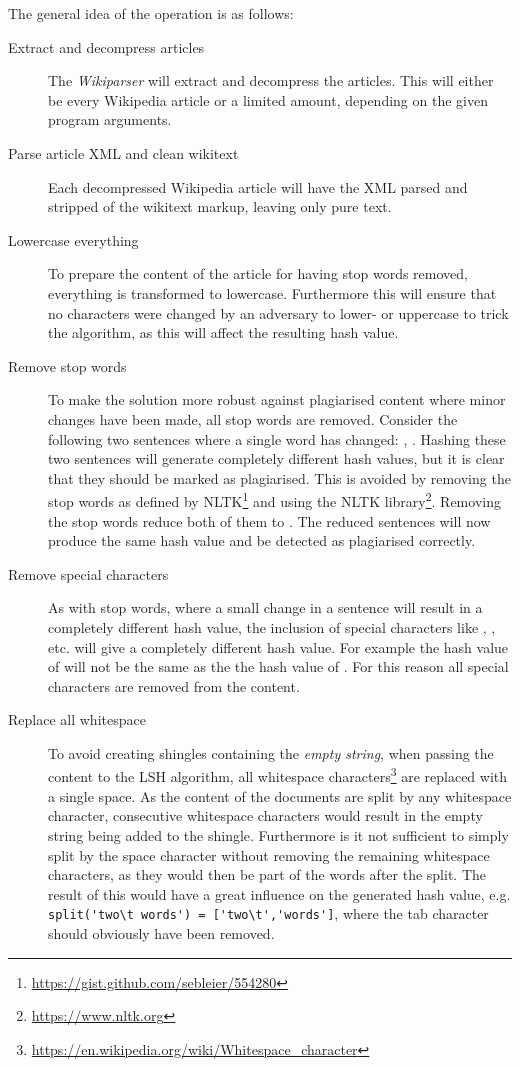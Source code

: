 The general idea of the operation is as follows:
\begin{description}
    \item[Extract and decompress articles] The \emph{Wikiparser} will extract and decompress the articles. This will either be every Wikipedia article or a limited amount, depending on the given program arguments.
    \item[Parse article XML and clean wikitext] Each decompressed Wikipedia article will have the XML parsed and stripped of the wikitext markup, leaving only pure text.
    \item[Lowercase everything] To prepare the content of the article for having stop words removed, everything is transformed to lowercase. Furthermore this will ensure that no characters were changed by an adversary to lower- or uppercase to trick the algorithm, as this will affect the resulting hash value.
    \item[Remove stop words] To make the solution more robust against plagiarised content where minor changes have been made, all stop words are removed. Consider the following two sentences where a single word has changed: , . Hashing these two sentences will generate completely different hash values, but it is clear that they should be marked as plagiarised. This is avoided by removing the stop words as defined by NLTK\footnote{\url{https://gist.github.com/sebleier/554280}} and using the NLTK library\footnote{\url{https://www.nltk.org}}. Removing the stop words reduce both of them to . The reduced sentences will now produce the same hash value and be detected as plagiarised correctly.
    \item[Remove special characters] As with stop words, where a small change in a sentence will result in a completely different hash value, the inclusion of special characters like , \say{,}, \say{;} etc. will give a completely different hash value. For example the hash value of  will not be the same as the the hash value of . For this reason all special characters are removed from the content.
    \item[Replace all whitespace] To avoid creating shingles containing the \emph{empty string}, when passing the content to the LSH algorithm, all whitespace characters\footnote{\url{https://en.wikipedia.org/wiki/Whitespace_character}} are replaced with a single space. As the content of the documents are split by any whitespace character, consecutive whitespace characters would result in the empty string being added to the shingle. Furthermore is it not sufficient to simply split by the space character without removing the remaining whitespace characters, as they would then be part of the words after the split. The result of this would have a great influence on the generated hash value, e.g. \verb|split('two\t words') = ['two\t','words']|, where the tab character should obviously have been removed.

\end{description}
